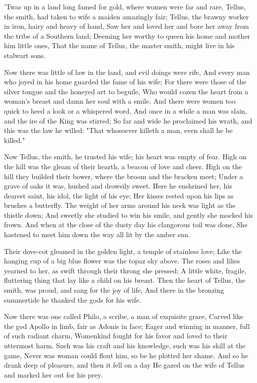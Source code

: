 
\begin{poemblock}
 'Twas up in a land long famed for gold, where women were far and rare,
 Tellus, the smith, had taken to wife a maiden amazingly fair;
 Tellus, the brawny worker in iron, hairy and heavy of hand,
 Saw her and loved her and bore her away from the tribe of a Southern land;
 Deeming her worthy to queen his home and mother him little ones,
 That the name of Tellus, the master smith, might live in his stalwart sons.

 Now there was little of law in the land, and evil doings were rife,
 And every man who joyed in his home guarded the fame of his wife;
 For there were those of the silver tongue and the honeyed art to beguile,
 Who would cozen the heart from a woman's breast
   and damn her soul with a smile.
 And there were women too quick to heed a look or a whispered word,
 And once in a while a man was slain, and the ire of the King was stirred;
 So far and wide he proclaimed his wrath, and this was the law he willed:
 "That whosoever killeth a man, even shall he be killed."

 Now Tellus, the smith, he trusted his wife; his heart was empty of fear.
 High on the hill was the gleam of their hearth, a beacon of love and cheer.
 High on the hill they builded their bower,
   where the broom and the bracken meet;
 Under a grave of oaks it was, hushed and drowsily sweet.
 Here he enshrined her, his dearest saint, his idol, the light of his eye;
 Her kisses rested upon his lips as brushes a butterfly.
 The weight of her arms around his neck was light as the thistle down;
 And sweetly she studied to win his smile, and gently she mocked his frown.
 And when at the close of the dusty day his clangorous toil was done,
 She hastened to meet him down the way all lit by the amber sun.

 Their dove-cot gleamed in the golden light, a temple of stainless love;
 Like the hanging cup of a big blue flower was the topaz sky above.
 The roses and lilies yearned to her,
   as swift through their throng she pressed;
 A little white, fragile, fluttering thing
   that lay like a child on his breast.
 Then the heart of Tellus, the smith, was proud,
   and sang for the joy of life,
 And there in the bronzing summertide he thanked the gods for his wife.

 Now there was one called Philo, a scribe, a man of exquisite grace,
 Carved like the god Apollo in limb, fair as Adonis in face;
 Eager and winning in manner, full of such radiant charm,
 Womenkind fought for his favor and loved to their uttermost harm.
 Such was his craft and his knowledge, such was his skill at the game,
 Never was woman could flout him, so be he plotted her shame.
 And so he drank deep of pleasure, and then it fell on a day
 He gazed on the wife of Tellus and marked her out for his prey.


\end{poemblock}

